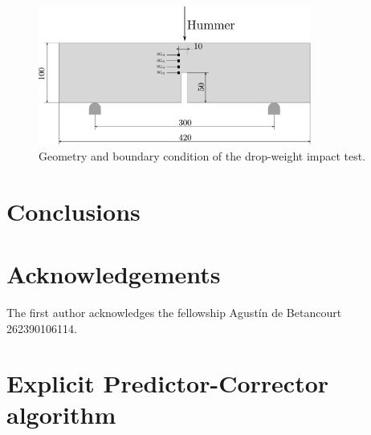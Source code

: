 \documentclass[preprint,12pt,a4paper]{elsarticle}
\begin{document}
\begin{figure}
  \centering
  \includegraphics[width=0.8\textwidth]{Figures/Drop_weight}
  \caption{Geometry and boundary condition of the drop-weight impact test.}
  \label{fig:geometry-drop-weight-impact-test}
\end{figure}


\section{Conclusions}
\label{sec:6}


\section*{Acknowledgements}
The first author acknowledges the fellowship Agustín de Betancourt 262390106114.

\appendix

\clearpage

\section{Explicit Predictor-Corrector algorithm}
\label{sec:expl-pred-corr}
\end{document}
